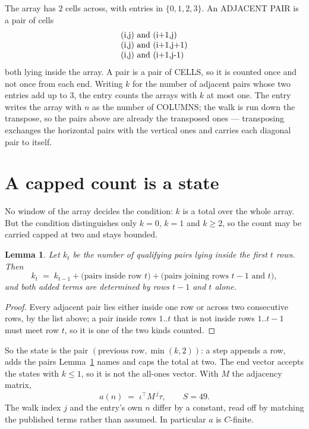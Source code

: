 \documentclass[11pt,a4paper]{article}
\theoremstyle{plain}
\newtheorem{lemma}[theorem]{Lemma}
\theoremstyle{definition}
\begin{document}
The array has $2$ cells across, with entries in $\{0,1,2,3\}$. An ADJACENT PAIR is a pair of cells
\[
\begin{array}{l}
$(i,j)\text{ and }(i{+}1,j)$ \\
$(i,j)\text{ and }(i{+}1,j{+}1)$ \\
$(i,j)\text{ and }(i{+}1,j{-}1)$ \\
\end{array}
\]
both lying inside the array. A pair is a pair of CELLS, so it is counted once and not once from
each end. Writing $k$ for the number of adjacent pairs whose two entries add up to $3$, the
entry counts the arrays with $k$ at most one. The entry writes the array with $n$ as the number of COLUMNS; the walk is run down the transpose, so the pairs above are already the transposed ones --- transposing exchanges the horizontal pairs with the vertical ones and carries each diagonal pair to itself.

\section{A capped count is a state}

No window of the array decides the condition: $k$ is a total over the whole array. But the
condition distinguishes only $k=0$, $k=1$ and $k\ge2$, so the count may be carried capped at
two and stays bounded.

\begin{lemma}\label{lem:cap}
Let $k_t$ be the number of qualifying pairs lying inside the first $t$ rows. Then
\[
k_{t}\;=\;k_{t-1}+\bigl(\text{pairs inside row } t\bigr)
+\bigl(\text{pairs joining rows } t-1 \text{ and } t\bigr),
\]
and both added terms are determined by rows $t-1$ and $t$ alone.
\end{lemma}

\begin{proof}
Every adjacent pair lies either inside one row or across two consecutive rows, by the list
above; a pair inside rows $1..t$ that is not inside rows $1..t-1$ must meet row $t$, so it is
one of the two kinds counted.
\end{proof}

So the state is the pair $(\text{previous row},\min(k,2))$: a step appends a row, adds the
pairs Lemma~\ref{lem:cap} names and caps the total at two. The end vector accepts the states
with $k\le1$, so it is not the all-ones vector. With $M$ the adjacency matrix,
\[
a(n)\;=\;\iota^{\!\top}M^{\,j}\tau ,\qquad S=49.
\]
The walk index $j$ and the entry's own $n$ differ by a constant, read off by matching the
published terms rather than assumed. In particular $a$ is $C$-finite.
\end{document}
